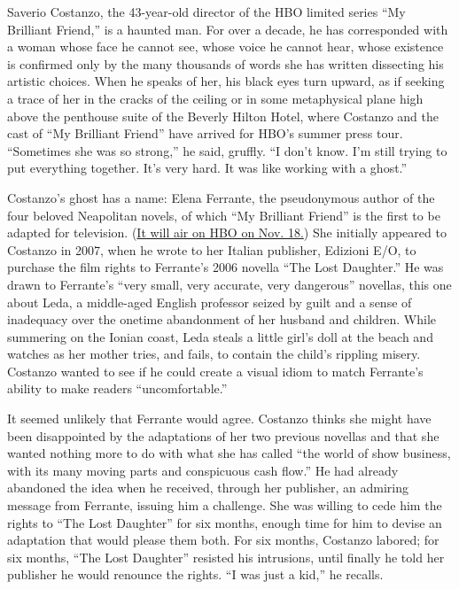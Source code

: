 Saverio Costanzo, the 43-year-old director of the HBO limited series
``My Brilliant Friend,'' is a haunted man. For over a decade, he has
corresponded with a woman whose face he cannot see, whose voice he
cannot hear, whose existence is confirmed only by the many thousands of
words she has written dissecting his artistic choices. When he speaks of
her, his black eyes turn upward, as if seeking a trace of her in the
cracks of the ceiling or in some metaphysical plane high above the
penthouse suite of the Beverly Hilton Hotel, where Costanzo and the cast
of ``My Brilliant Friend'' have arrived for HBO's summer press tour.
``Sometimes she was so strong,'' he said, gruffly. ``I don't know. I'm
still trying to put everything together. It's very hard. It was like
working with a ghost.''

Costanzo's ghost has a name: Elena Ferrante, the pseudonymous author of
the four beloved Neapolitan novels, of which ``My Brilliant Friend'' is
the first to be adapted for television.
(\href{https://www.nytimes3xbfgragh.onion/2017/05/26/books/elena-ferrante-on-my-brilliant-friend-moving-to-the-screen.html}{It
will air on HBO on Nov. 18.}) She initially appeared to Costanzo in
2007, when he wrote to her Italian publisher, Edizioni E/O, to purchase
the film rights to Ferrante's 2006 novella ``The Lost Daughter.'' He was
drawn to Ferrante's ``very small, very accurate, very dangerous''
novellas, this one about Leda, a middle-aged English professor seized by
guilt and a sense of inadequacy over the onetime abandonment of her
husband and children. While summering on the Ionian coast, Leda steals a
little girl's doll at the beach and watches as her mother tries, and
fails, to contain the child's rippling misery. Costanzo wanted to see if
he could create a visual idiom to match Ferrante's ability to make
readers ``uncomfortable.''

It seemed unlikely that Ferrante would agree. Costanzo thinks she might
have been disappointed by the adaptations of her two previous novellas
and that she wanted nothing more to do with what she has called ``the
world of show business, with its many moving parts and conspicuous cash
flow.'' He had already abandoned the idea when he received, through her
publisher, an admiring message from Ferrante, issuing him a challenge.
She was willing to cede him the rights to ``The Lost Daughter'' for six
months, enough time for him to devise an adaptation that would please
them both. For six months, Costanzo labored; for six months, ``The Lost
Daughter'' resisted his intrusions, until finally he told her publisher
he would renounce the rights. ``I was just a kid,'' he recalls.

